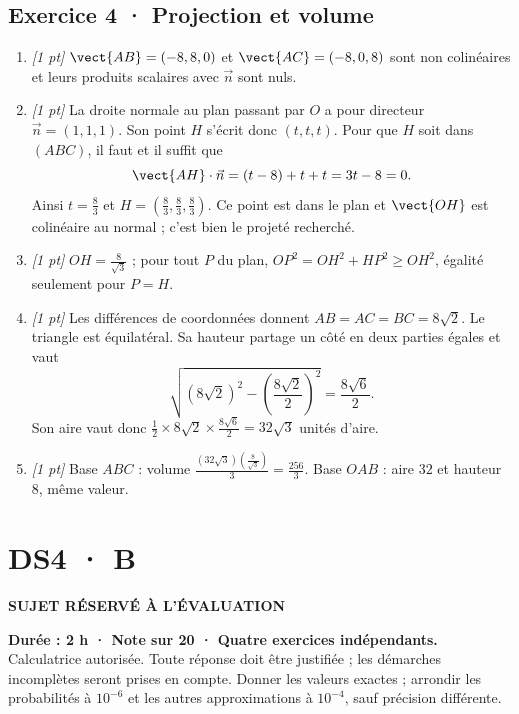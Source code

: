 \subsection*{Exercice 4 · Projection et volume}\begin{enumerate}

\item \textit{[1 pt]} $\vect{AB}=(-8,8,0)$ et $\vect{AC}=(-8,0,8)$ sont non colinéaires et leurs produits scalaires avec $\vec n$ sont nuls.

\item \textit{[1 pt]} La droite normale au plan passant par $O$ a pour directeur $\vec n=(1,1,1)$. Son point $H$ s'écrit donc $(t,t,t)$. Pour que $H$ soit dans $(ABC)$, il faut et il suffit que
\[\vect{AH}\cdot\vec n=(t-8)+t+t=3t-8=0.\]
Ainsi $t=\frac{8}{3}$ et $H=(\frac{8}{3},\frac{8}{3},\frac{8}{3})$. Ce point est dans le plan et $\vect{OH}$ est colinéaire au normal ; c'est bien le projeté recherché.

\item \textit{[1 pt]} $OH=\frac{8}{\sqrt{3}}$ ; pour tout $P$ du plan, $OP^2=OH^2+HP^2\ge OH^2$, égalité seulement pour $P=H$.

\item \textit{[1 pt]} Les différences de coordonnées donnent $AB=AC=BC=8\sqrt2$. Le triangle est équilatéral. Sa hauteur partage un côté en deux parties égales et vaut
\[\sqrt{(8\sqrt2)^2-(\frac{8\sqrt{2}}{2})^2}=\frac{8\sqrt6}{2}.\]
Son aire vaut donc $\frac12\times 8\sqrt2\times\frac{8\sqrt6}{2}=32\sqrt3$ unités d'aire.

\item \textit{[1 pt]} Base $ABC$ : volume $\frac{(32\sqrt3)(\frac{8}{\sqrt{3}})}{3}=\frac{256}{3}$. Base $OAB$ : aire $32$ et hauteur $8$, même valeur.

\end{enumerate}

\fi

\fi

\ifprof

\clearpage{}\label{sujet:6-4}

\section*{DS4 · B}

{\sffamily\bfseries\color{amber}SUJET RÉSERVÉ À L'ÉVALUATION\par}

\textbf{Durée : 2 h · Note sur 20 · Quatre exercices indépendants.}\\Calculatrice autorisée. Toute réponse doit être justifiée ; les démarches incomplètes seront prises en compte. Donner les valeurs exactes ; arrondir les probabilités à $10^{-6}$ et les autres approximations à $10^{-4}$, sauf précision différente.

